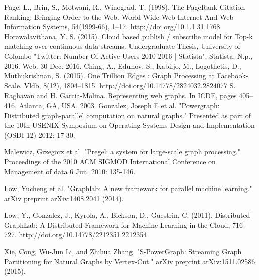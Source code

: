 \documentclass[12pt]{report}
\numberwithin{figure}{section}
\numberwithin{table}{section}
\begin{document}
\begin{thebibliography}{1}

   Page, L., Brin, S., Motwani, R.,  Winograd, T. (1998). The PageRank Citation Ranking: Bringing Order to the Web. World Wide Web Internet And Web Information Systems, 54(1999-66), 1–17. http://doi.org/10.1.1.31.1768
   Horawalavithana, Y. S. (2015). Cloud based publish / subscribe model for Top-k matching over continuous data streams. Undergraduate Thesis, University of Colombo
   "Twitter: Number Of Active Users 2010-2016 | Statista". Statista. N.p., 2016. Web. 30 Dec. 2016.
   Ching, A., Edunov, S., Kabiljo, M., Logothetis, D.,  Muthukrishnan, S. (2015). One Trillion Edges : Graph Processing at Facebook-Scale. Vldb, 8(12), 1804–1815. http://doi.org/10.14778/2824032.2824077
   S. Raghavan and H. Garcia-Molina. Representing web graphs. In ICDE, pages 405–416, Atlanta, GA, USA, 2003.
   Gonzalez, Joseph E et al. "Powergraph: Distributed graph-parallel computation on natural graphs." Presented as part of the 10th USENIX Symposium on Operating Systems Design and Implementation (OSDI 12) 2012: 17-30.

    Malewicz, Grzegorz et al. "Pregel: a system for large-scale graph processing." Proceedings of the 2010 ACM SIGMOD International Conference on Management of data 6 Jun. 2010: 135-146.

   Low, Yucheng et al. "Graphlab: A new framework for parallel machine learning." arXiv preprint arXiv:1408.2041 (2014).
  
   Low, Y., Gonzalez, J., Kyrola, A., Bickson, D.,  Guestrin, C. (2011). Distributed GraphLab: A Distributed Framework for Machine Learning in the Cloud, 716–727. http://doi.org/10.14778/2212351.2212354
  
   Xie, Cong, Wu-Jun Li, and Zhihua Zhang. "S-PowerGraph: Streaming Graph Partitioning for Natural Graphs by Vertex-Cut." arXiv preprint arXiv:1511.02586 (2015).
  

\end{thebibliography}
\end{document}
